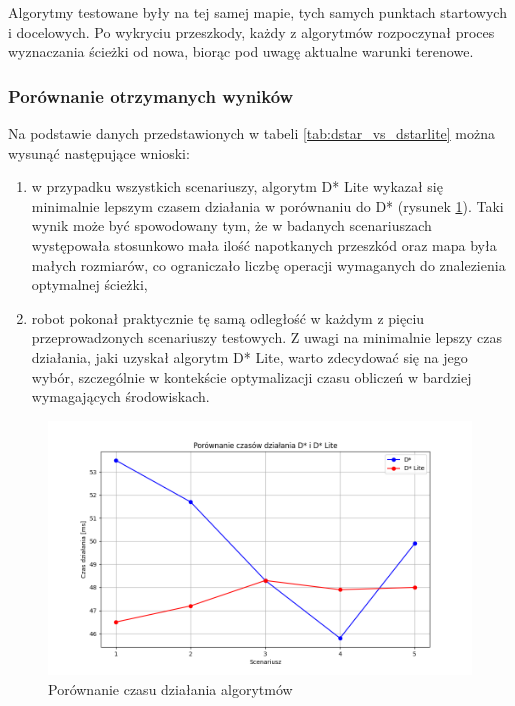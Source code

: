\documentclass[12pt,twoside]{article}
\begin{document}
Algorytmy testowane były na tej samej mapie, tych samych punktach startowych i docelowych. Po wykryciu przeszkody, każdy z algorytmów rozpoczynał proces wyznaczania ścieżki od nowa, biorąc pod uwagę aktualne warunki terenowe.

\subsubsection{Porównanie otrzymanych wyników}
Na podstawie danych przedstawionych w tabeli \ref{tab:dstar_vs_dstarlite} można wysunąć następujące wnioski:

\begin{enumerate}[label=\alph*), leftmargin=1.25cm]
    \item w przypadku wszystkich scenariuszy, algorytm D* Lite wykazał się minimalnie lepszym czasem działania w porównaniu do D* (rysunek \ref{Fig:dstar_vs_lite}). Taki wynik może być spowodowany tym, że w badanych scenariuszach występowała stosunkowo mała ilość napotkanych przeszkód oraz mapa była małych rozmiarów, co ograniczało liczbę operacji wymaganych do znalezienia optymalnej ścieżki,
    \item robot pokonał praktycznie tę samą odległość w każdym z pięciu przeprowadzonych scenariuszy testowych. Z uwagi na minimalnie lepszy czas działania, jaki uzyskał algorytm D* Lite, warto zdecydować się na jego wybór, szczególnie w kontekście optymalizacji czasu obliczeń w bardziej wymagających środowiskach. 
\end{enumerate}

\begin{figure}[ht]%
 \centering%
 \includegraphics[width=12cm]{figures/dynamic/dstar_vs_lite.png}%
 \caption{Porównanie czasu działania algorytmów}%
 \label{Fig:dstar_vs_lite}%
\end{figure}
\end{document}
